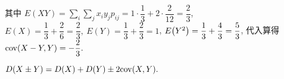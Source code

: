 \begin{solution}
\begin{minipage}{0.69\linewidth}
\begin{enumerate}[label=(\arabic{*})]
                  其中 $\displaystyle E(XY)=\sum_i\sum_j x_iy_jp_{ij}=1\cdot\dfrac{1}{3}+2\cdot\dfrac{2}{12}=\dfrac{2}{3}$,
                  $E(X)=\dfrac{1}{3}+\dfrac{2}{6}=\dfrac{2}{3},~E(Y)=\dfrac{1}{3}+\dfrac{2}{3}=1$,
                  $E\qty(Y^2)=\dfrac{1}{3}+\dfrac{4}{3}=\dfrac{5}{3}$, 代入算得 $\mathrm{cov}(X-Y,Y)=-\dfrac{2}{3}.$
        \end{enumerate}
    \end{minipage}
\end{solution}

\begin{theorem}[协方差与方差]
    $D(X\pm Y)=D(X)+D(Y)\pm 2\mathrm{cov}(X,Y).$
\end{theorem}

